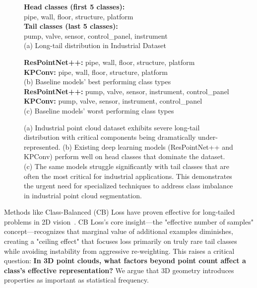 \documentclass[preprint,12pt]{elsarticle}
\begin{document}
\begin{figure}[htbp]
    \centering
    \begin{minipage}{0.48\textwidth}
        \centering
        \textbf{Head classes (first 5 classes):}\\
        pipe, wall, floor, structure, platform\\[1ex]
        \textbf{Tail classes (last 5 classes):}\\
        pump, valve, sensor, control\_panel, instrument\\
        (a) Long-tail distribution in Industrial Dataset
    \end{minipage}
    \hfill
    \begin{minipage}{0.48\textwidth}
        \centering
        \textbf{ResPointNet++:} pipe, wall, floor, structure, platform\\
        \textbf{KPConv:} pipe, wall, floor, structure, platform\\
        (b) Baseline models' best performing class types\\[1ex]
        \textbf{ResPointNet++:} pump, valve, sensor, instrument, control\_panel\\
        \textbf{KPConv:} pump, valve, sensor, instrument, control\_panel\\
        (c) Baseline models' worst performing class types
    \end{minipage}
    \caption{(a) Industrial point cloud dataset exhibits severe long-tail distribution with critical components being dramatically under-represented. (b) Existing deep learning models (ResPointNet++ and KPConv) perform well on head classes that dominate the dataset. (c) The same models struggle significantly with tail classes that are often the most critical for industrial applications. This demonstrates the urgent need for specialized techniques to address class imbalance in industrial point cloud segmentation.}
    \label{fig:longtail}
\end{figure}

Methods like Class-Balanced (CB) Loss have proven effective for long-tailed problems in 2D vision~\cite{cui2019class}. CB Loss's core insight—the "effective number of samples" concept—recognizes that marginal value of additional examples diminishes, creating a "ceiling effect" that focuses loss primarily on truly rare tail classes while avoiding instability from aggressive re-weighting. This raises a critical question: \textbf{In 3D point clouds, what factors beyond point count affect a class's effective representation?} We argue that 3D geometry introduces properties as important as statistical frequency.
\end{document}
